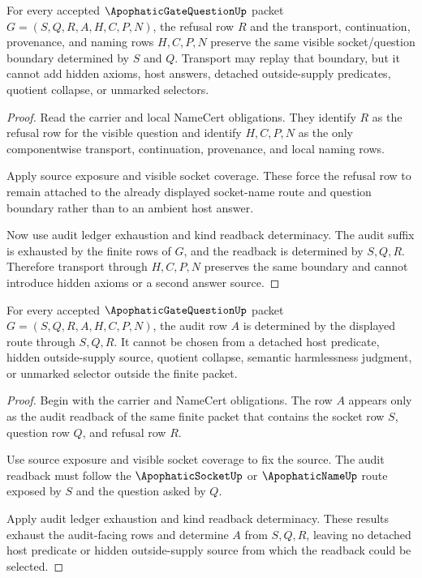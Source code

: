 \begin{theorem}
\label{thm:apophatic-gate-question-refusal-transport-scope}
For every accepted $\ApophaticGateQuestionUp$ packet $G=(S,Q,R,A,H,C,P,N)$, the refusal row $R$ and the transport, continuation, provenance, and naming rows $H,C,P,N$ preserve the same visible socket/question boundary determined by $S$ and $Q$. Transport may replay that boundary, but it cannot add hidden axioms, host answers, detached outside-supply predicates, quotient collapse, or unmarked selectors.
\end{theorem}
\begin{proof}
Read the carrier and local NameCert obligations. They identify $R$ as the refusal row for the visible question and identify $H,C,P,N$ as the only componentwise transport, continuation, provenance, and local naming rows.

Apply source exposure and visible socket coverage. These force the refusal row to remain attached to the already displayed socket-name route and question boundary rather than to an ambient host answer.

Now use audit ledger exhaustion and kind readback determinacy. The audit suffix is exhausted by the finite rows of $G$, and the readback is determined by $S,Q,R$. Therefore transport through $H,C,P,N$ preserves the same boundary and cannot introduce hidden axioms or a second answer source.
\end{proof}

\begin{theorem}
\label{thm:apophatic-gate-question-audit-readback-source-determinacy}
For every accepted $\ApophaticGateQuestionUp$ packet $G=(S,Q,R,A,H,C,P,N)$, the audit row $A$ is determined by the displayed route through $S,Q,R$. It cannot be chosen from a detached host predicate, hidden outside-supply source, quotient collapse, semantic harmlessness judgment, or unmarked selector outside the finite packet.
\end{theorem}
\begin{proof}
Begin with the carrier and NameCert obligations. The row $A$ appears only as the audit readback of the same finite packet that contains the socket row $S$, question row $Q$, and refusal row $R$.

Use source exposure and visible socket coverage to fix the source. The audit readback must follow the $\ApophaticSocketUp$ or $\ApophaticNameUp$ route exposed by $S$ and the question asked by $Q$.

Apply audit ledger exhaustion and kind readback determinacy. These results exhaust the audit-facing rows and determine $A$ from $S,Q,R$, leaving no detached host predicate or hidden outside-supply source from which the readback could be selected.
\end{proof}

